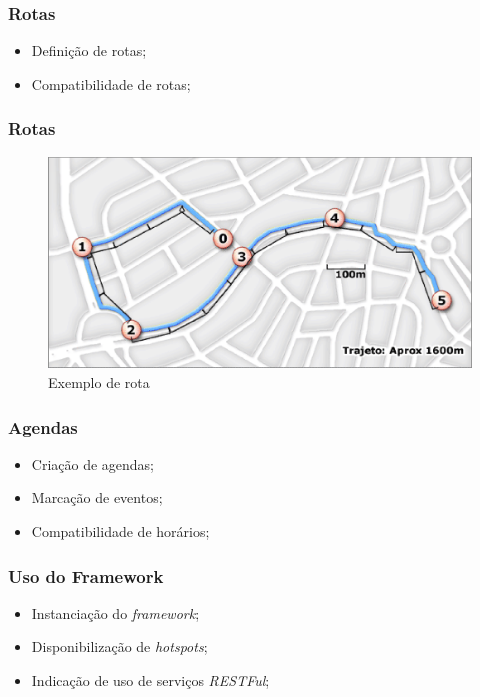 \documentclass{beamer}
\begin{document}
\begin{frame}
\frametitle{Rotas}

\begin{itemize}
	\item Definição de rotas;
	\item Compatibilidade de rotas;
\end{itemize}

\end{frame}

\begin{frame}
\frametitle{Rotas}

\begin{figure}[!h]
	\centering
	\includegraphics[scale=0.55]{../figuras/capitulo5/rota.eps}
	\caption[Exemplo de rota]{Exemplo de rota\footnotemark}
	\label{rota}
\end{figure}

\end{frame}

\begin{frame}
\frametitle{Agendas}

\begin{itemize}
	\item Criação de agendas;
	\item Marcação de eventos;
	\item Compatibilidade de horários;
\end{itemize}

\end{frame}

\begin{frame}
\frametitle{Uso do Framework}

\begin{itemize}
	\item Instanciação do \textit{framework};
	\item Disponibilização de \textit{hotspots};
	\item Indicação de uso de serviços \textit{RESTFul};
\end{itemize}

\end{frame}
\end{document}
